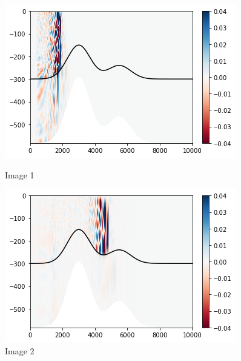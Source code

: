 \documentclass{rapportECC}
\begin{document}
\begin{figure}[H] %
    \centering
    \begin{minipage}{0.45\textwidth}
        \centering
        \includegraphics[width=\linewidth]{images/im2.png}
        \caption{Image 1}
        \label{fig:image1}
    \end{minipage}
    \hspace{0.05\textwidth} %
    \begin{minipage}{0.45\textwidth}
        \centering
        \includegraphics[width=\linewidth]{images/im4.png}
        \caption{Image 2}
        \label{fig:image2}
    \end{minipage}
    \vspace{1cm} %

\end{figure}
\end{document}
